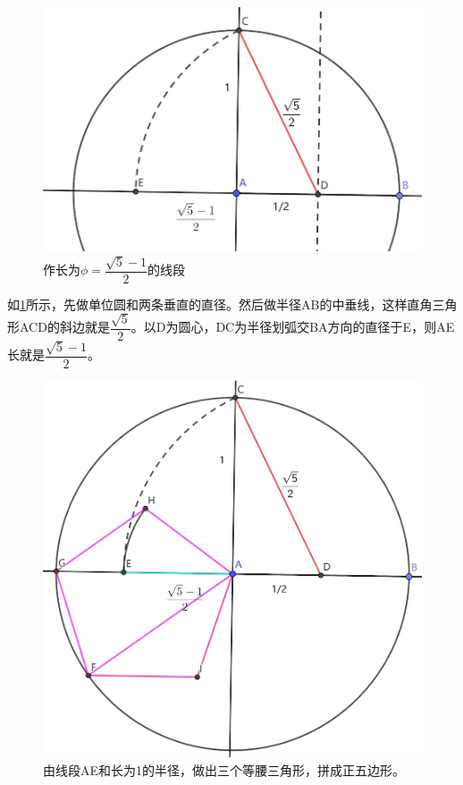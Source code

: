 \documentclass[b5paper]{ctexart}
\begin{document}
\begin{figure}[htbp]
 \centering
 \includegraphics[scale=0.3]{img/phi}
 \caption{作长为$\phi = \dfrac{\sqrt{5} - 1}{2}$的线段}
 \label{fig:phi}
\end{figure}

如\cref{fig:phi}所示，先做单位圆和两条垂直的直径。然后做半径AB的中垂线，这样直角三角形ACD的斜边就是$\dfrac{\sqrt{5}}{2}$。以D为圆心，DC为半径划弧交BA方向的直径于E，则AE长就是$\dfrac{\sqrt{5} - 1}{2}$。

\begin{figure}[htbp]
 \centering
 \includegraphics[scale=0.35]{img/pentagon-phi}
 \caption{由线段AE和长为1的半径，做出三个等腰三角形，拼成正五边形。}
 \label{fig:pentagon-phi}
\end{figure}
\end{document}
